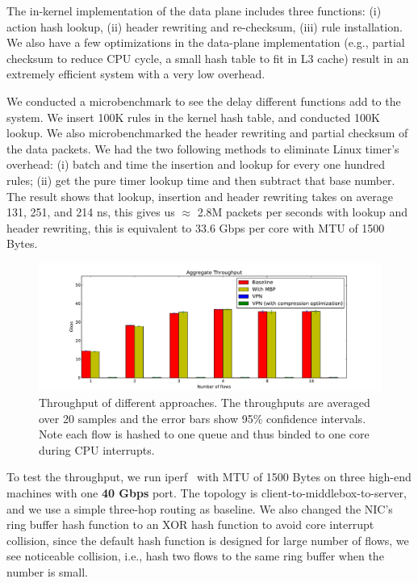 The in-kernel implementation of the data plane includes three functions: (i) action hash lookup, (ii) header rewriting and re-checksum, (iii) rule installation. We also have a few optimizations in the data-plane implementation (e.g., partial checksum to reduce CPU cycle, a small hash table to fit in L3 cache) result in an extremely efficient system with a very low overhead.

We conducted a microbenchmark to see the delay different functions add to the system. We insert 100K rules in the kernel hash table, and conducted 100K lookup. We also microbenchmarked the header rewriting and partial checksum of the data packets. We had the two following methods to eliminate Linux timer's overhead: (i) batch and time the insertion and lookup for every one hundred rules; (ii) get the pure timer lookup time and then subtract that base number. The result shows that lookup, insertion and header rewriting takes on average 131, 251, and 214 ns, this gives us $\approx $ 2.8M packets per seconds with lookup and header rewriting, this is equivalent to 33.6 Gbps per core with MTU of 1500 Bytes.



\begin{figure}[ht]

\centering
\includegraphics[width=\linewidth]{figures/throughput.pdf} 

\caption{\small Throughput of different approaches. The throughputs are averaged over 20 samples and the error bars show 95\% confidence intervals. Note each flow is hashed to one queue and thus binded to one core during CPU interrupts.}\label{throughput} 
\end{figure}

To test the throughput, we run iperf~\cite{iperf} with MTU of 1500 Bytes on three high-end machines with one \textbf{40 Gbps} port. The topology is client-to-middlebox-to-server, and we use a simple three-hop routing as baseline. We also changed the NIC's ring buffer hash function to an XOR hash function to avoid core interrupt collision, since the default hash function is designed for large number of flows, we see noticeable collision, i.e., hash two flows to the same ring buffer when the number is small.


